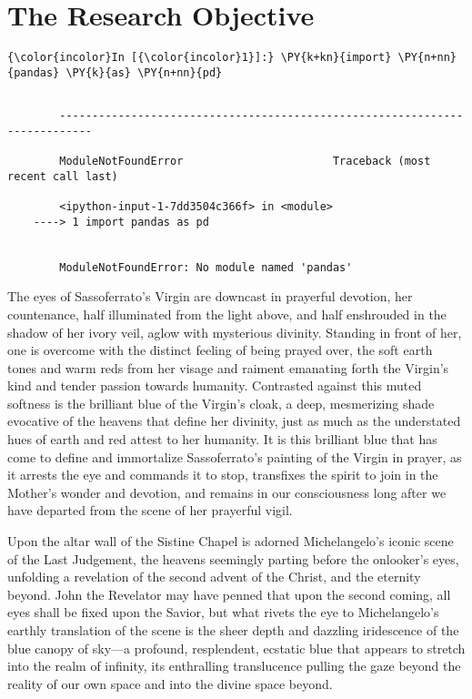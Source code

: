    
    
    

    \hypertarget{The Research Objective}{\chapter{The Research Objective}\label{The Research Objective}}
    \begin{Verbatim}[commandchars=\\\{\}]
{\color{incolor}In [{\color{incolor}1}]:} \PY{k+kn}{import} \PY{n+nn}{pandas} \PY{k}{as} \PY{n+nn}{pd}
\end{Verbatim}

    \begin{Verbatim}[commandchars=\\\{\}]

        ---------------------------------------------------------------------------

        ModuleNotFoundError                       Traceback (most recent call last)

        <ipython-input-1-7dd3504c366f> in <module>
    ----> 1 import pandas as pd
    

        ModuleNotFoundError: No module named 'pandas'
    \end{Verbatim}

    The eyes of Sassoferrato's Virgin are downcast in prayerful devotion,
her countenance, half illuminated from the light above, and half
enshrouded in the shadow of her ivory veil, aglow with mysterious
divinity. Standing in front of her, one is overcome with the distinct
feeling of being prayed over, the soft earth tones and warm reds from
her visage and raiment emanating forth the Virgin's kind and tender
passion towards humanity. Contrasted against this muted softness is the
brilliant blue of the Virgin's cloak, a deep, mesmerizing shade
evocative of the heavens that define her divinity, just as much as the
understated hues of earth and red attest to her humanity. It is this
brilliant blue that has come to define and immortalize Sassoferrato's
painting of the Virgin in prayer, as it arrests the eye and commands it
to stop, transfixes the spirit to join in the Mother's wonder and
devotion, and remains in our consciousness long after we have departed
from the scene of her prayerful vigil.

Upon the altar wall of the Sistine Chapel is adorned Michelangelo's
iconic scene of the Last Judgement, the heavens seemingly parting before
the onlooker's eyes, unfolding a revelation of the second advent of the
Christ, and the eternity beyond. John the Revelator may have penned that
upon the second coming, all eyes shall be fixed upon the Savior, but
what rivets the eye to Michelangelo's earthly translation of the scene
is the sheer depth and dazzling iridescence of the blue canopy of
sky---a profound, resplendent, ecstatic blue that appears to stretch
into the realm of infinity, its enthralling translucence pulling the
gaze beyond the reality of our own space and into the divine space
beyond.


